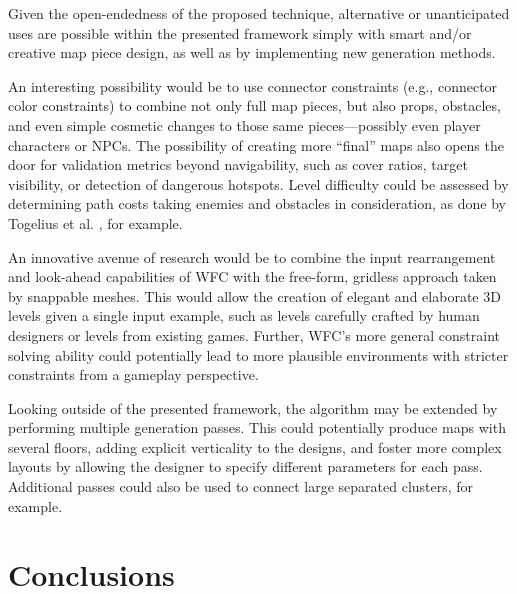\documentclass[journal]{IEEEtran}
\begin{document}
Given the open-endedness of the proposed technique, alternative or unanticipated
uses are possible within the presented framework simply with smart and/or
creative map piece design, as well as by implementing new generation methods.

An interesting possibility would be to use connector constraints (e.g., connector
color constraints) to combine not only full map pieces, but also props, obstacles, and
even simple cosmetic changes to those same pieces---possibly even player characters
or NPCs. The possibility of creating more ``final'' maps also opens the door for
validation metrics beyond navigability, such as cover ratios, target visibility,
or detection of dangerous hotspots. Level difficulty could be assessed by
determining path costs taking enemies and obstacles in consideration, as done by
Togelius et al. \cite{togelius2012compositional}, for example.

An innovative avenue of research would be to combine the input rearrangement and
look-ahead capabilities of WFC with the free-form, gridless approach taken by
snappable meshes. This would allow the creation of elegant and elaborate 3D levels
given a single input example, such as levels carefully crafted by human designers
or levels from existing games. Further, WFC's more general constraint solving ability
could potentially lead to more plausible environments with stricter constraints from
a gameplay perspective.

Looking outside of the presented framework, the algorithm may be extended by
performing multiple generation passes. This could potentially produce maps with
several floors, adding explicit verticality to the designs, and foster more complex
layouts by allowing the designer to specify different parameters for each pass.
Additional passes could also be used to connect large separated clusters, for example.

\section{Conclusions}
\label{sec:conclusion}
\end{document}

